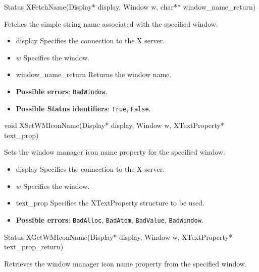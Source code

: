 \documentclass{report}
\begin{document}
\begin{itemize}
            \begin{cppcode}
            Status XFetchName(Display* display, Window w, char** window_name_return)
            \end{cppcode}
            \bigbreak \noindent
            Fetches the simple string name associated with the specified window.

            \begin{itemize}
                \item display Specifies the connection to the X server.
                \item $w$ Specifies the window.
                \item window\_name\_return Returns the window name.
            \end{itemize}

            \begin{itemize}
                \item \textbf{Possible errors}: \texttt{BadWindow}.
                \item \textbf{Possible Status identifiers}: \texttt{True}, \texttt{False}.
            \end{itemize}

            \begin{cppcode}
            void XSetWMIconName(Display* display, Window w, XTextProperty* text_prop)
            \end{cppcode}
            \bigbreak \noindent
            Sets the window manager icon name property for the specified window.

            \begin{itemize}
                \item display Specifies the connection to the X server.
                \item $w$ Specifies the window.
                \item text\_prop Specifies the XTextProperty structure to be used.
            \end{itemize}

            \begin{itemize}
                \item \textbf{Possible errors}: \texttt{BadAlloc}, \texttt{BadAtom}, \texttt{BadValue}, \texttt{BadWindow}.
            \end{itemize}

            \begin{cppcode}
                Status XGetWMIconName(Display* display, Window w, XTextProperty* text_prop_return)
            \end{cppcode}
            \bigbreak \noindent
            Retrieves the window manager icon name property from the specified window.


\end{itemize}
\end{document}
